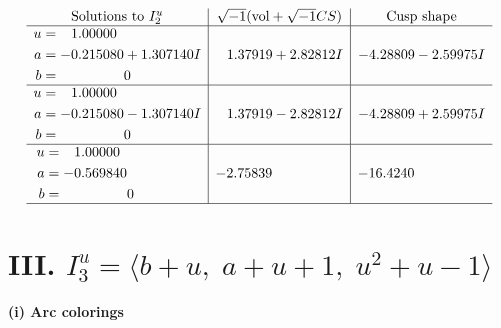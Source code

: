 \documentclass[1p]{elsarticle_modified}
\theoremstyle{definition}
\newcommand{\I}{\sqrt{-1}}
\begin{document}
$$\begin{array}{c|c|c}  
\text{Solutions to }I^u_{2}& \I (\text{vol} + \sqrt{-1}CS) & \text{Cusp shape}\\
 \hline 
\begin{aligned}
u &= \phantom{-}1.00000\phantom{ +0.000000I} \\
a &= -0.215080 + 1.307140 I \\
b &= \phantom{-0.000000 } 0\end{aligned}
 & \phantom{-}1.37919 + 2.82812 I & -4.28809 - 2.59975 I \\ \hline\begin{aligned}
u &= \phantom{-}1.00000\phantom{ +0.000000I} \\
a &= -0.215080 - 1.307140 I \\
b &= \phantom{-0.000000 } 0\end{aligned}
 & \phantom{-}1.37919 - 2.82812 I & -4.28809 + 2.59975 I \\ \hline\begin{aligned}
u &= \phantom{-}1.00000\phantom{ +0.000000I} \\
a &= -0.569840\phantom{ +0.000000I} \\
b &= \phantom{-0.000000 } 0\end{aligned}
 & -2.75839\phantom{ +0.000000I} & -16.4240\phantom{ +0.000000I}\\
 \hline 
 \end{array}$$\newpage\newpage\renewcommand{\arraystretch}{1}
\centering \section*{III. $I^u_{3}= \langle b+u,\;a+u+1,\;u^2+u-1 \rangle$}
\flushleft \textbf{(i) Arc colorings}\\
\end{document}

